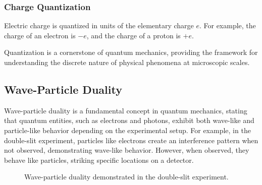 \documentclass[12pt,a4paper]{report}
\begin{document}
\subsubsection{Charge Quantization}
Electric charge is quantized in units of the elementary charge \( e \). For example, the charge of an electron is \( -e \), and the charge of a proton is \( +e \).

Quantization is a cornerstone of quantum mechanics, providing the framework for understanding the discrete nature of physical phenomena at microscopic scales.

\subsection{Wave-Particle Duality}
Wave-particle duality is a fundamental concept in quantum mechanics, stating that quantum entities, such as electrons and photons, exhibit both wave-like and particle-like behavior depending on the experimental setup. For example, in the double-slit experiment, particles like electrons create an interference pattern when not observed, demonstrating wave-like behavior. However, when observed, they behave like particles, striking specific locations on a detector.

\begin{figure}[H]
    \centering
    \caption{Wave-particle duality demonstrated in the double-slit experiment.}
\end{figure}
\end{document}
